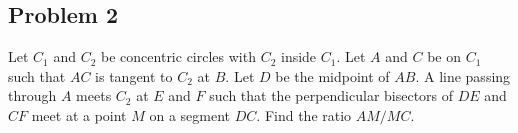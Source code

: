 \documentclass[12pt]{scrartcl}
\newcommand{\<}{\langle}
\renewcommand{\>}{\rangle}
\begin{document}
\subsection{Problem 2}
\begin{Prob} Let $C_1$ and $C_2$ be concentric circles with $C_2$ inside $C_1$.  Let $A$ and $C$ be on $C_1$ such that $AC$ is tangent to $C_2$ at $B$.  Let $D$ be the midpoint of $AB$.  A line passing through $A$ meets $C_2$ at $E$ and $F$ such that the perpendicular bisectors of $DE$ and $CF$ meet at a point $M$ on a segment $DC$.  Find the ratio $AM/MC$.
\end{Prob}
\end{document}
